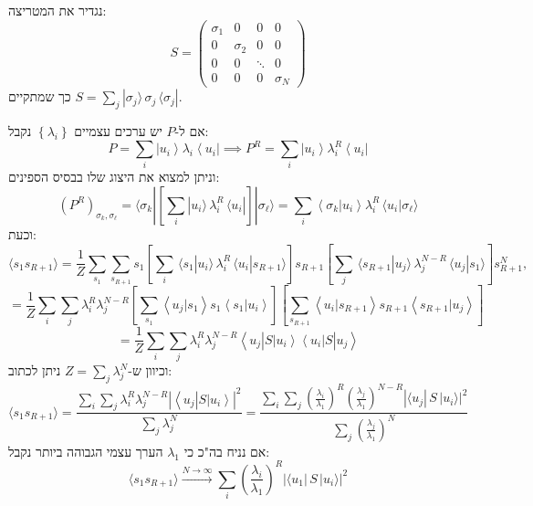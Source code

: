 \documentclass{tstextbook}
\begin{document}
\begin{symbolize}
נגדיר את המטריצה:
$$S=\begin{pmatrix}\sigma_{1} & 0 & 0 & 0 \\0 & \sigma_{2} & 0 & 0 \\0 & 0 & \ddots & 0 \\0 & 0 & 0 & \sigma_{N}
\end{pmatrix}$$
כך שמתקיים \(S=\sum_{j}|\sigma_{j}\rangle\,\sigma_{j}\,\langle\sigma_{j}|\).

\end{symbolize}
\begin{corollary}
אם ל-\(P\) יש ערכים עצמיים \(\left\{  \lambda_{i}  \right\}\) נקבל:
$$P=\sum_{i}\left|u_{i}\right\rangle\lambda_{i}\left\langle u_{i}\right|\implies P^{R}=\sum_{i}\left|u_{i}\right\rangle\lambda_{i}^{R}\left\langle u_{i}\right|$$
וניתן למצוא את היצוג שלו בבסיס הספינים:
$$\left(P^{R}\right)_{\sigma_{k},\sigma_{\ell}}=\langle\sigma_{k}|\left[\sum_{i}|u_{i}\rangle\,\lambda_{i}^{R}\,\langle u_{i}|\right]|\sigma_{\ell}\rangle=\sum_{i}\left\langle\sigma_{k}|u_{i}\right\rangle\lambda_{i}^{R}\,\langle u_{i}|\sigma_{\ell}\rangle$$
וכעת:
$$\langle s_{1}s_{R+1}\rangle=\frac{1}{Z}\sum_{s_{1}}\sum_{s_{R+1}}s_{1}\left[\sum_{i}\,\langle s_{1}|u_{i}\rangle\,\lambda_{i}^{R}\,\langle u_{i}|s_{R+1}\rangle\right]s_{R+1}\left[\sum_{j}\,\langle s_{R+1}|u_{j}\rangle\,\lambda_{j}^{N-R}\,\langle u_{j}|s_{1}\rangle\right]s_{R+1}^{N},$$$$=\frac{1}{Z}\sum_{i}\sum_{j}\lambda_{i}^{R}\lambda_{j}^{N-R}\left[\sum_{s_{1}}\left\langle u_{j}|s_{1}\right\rangle s_{1}\left\langle s_{1}|u_{i}\right\rangle\right]\left[\sum_{s_{R+1}}\left\langle u_{i}|s_{R+1}\right\rangle s_{R+1}\left\langle s_{R+1}|u_{j}\right\rangle\right]$$$$=\frac{1}{Z}\sum_{i}\sum_{j}\lambda_{i}^{R}\lambda_{j}^{N-R}\left\langle u_{j}\right|S\left|u_{i}\right\rangle\left\langle u_{i}\right|S\left|u_{j}\right\rangle$$
וכיוון ש-\(Z=\sum_{j}\lambda_{j}^{N}\) ניתן לכתוב:
$$\langle s_{1}s_{R+1}\rangle=\frac{\sum_{i}\sum_{j}\lambda_{i}^{R}\lambda_{j}^{N-R}\left|\left\langle u_{j}\right|S\left|u_{i}\right\rangle\right|^{2}}{\sum_{j}\lambda_{j}^{N}}=\frac{\sum_{i}\sum_{j}\left(\frac{\lambda_{i}}{\lambda_{1}}\right)^{R}\left(\frac{\lambda_{j}}{\lambda_{1}}\right)^{N-R}|\langle u_{j}|\,S\,|u_{i}\rangle|^{2}}{\sum_{j}\left(\frac{\lambda_{j}}{\lambda_{1}}\right)^{N}}$$
אם נניח בה"כ כי \(\lambda_{1}\) הערך עצמי הגבוהה ביותר נקבל:
$$\langle s_{1}s_{R+1}\rangle\stackrel{N\rightarrow\infty}{\longrightarrow}\sum_{i}\left(\frac{\lambda_{i}}{\lambda_{1}}\right)^{R}|\langle u_{1}|\,S\,|u_{i}\rangle|^{2}$$

\end{corollary}
\end{document}
